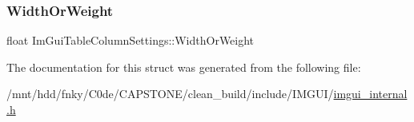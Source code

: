 \subsubsection{\texorpdfstring{Width\+Or\+Weight}{WidthOrWeight}}
{\footnotesize\ttfamily float Im\+Gui\+Table\+Column\+Settings\+::\+Width\+Or\+Weight}



The documentation for this struct was generated from the following file\+:\begin{DoxyCompactItemize}
\item 
/mnt/hdd/fnky/\+C0de/\+C\+A\+P\+S\+T\+O\+N\+E/clean\+\_\+build/include/\+I\+M\+G\+U\+I/\hyperlink{imgui__internal_8h}{imgui\+\_\+internal.\+h}\end{DoxyCompactItemize}
